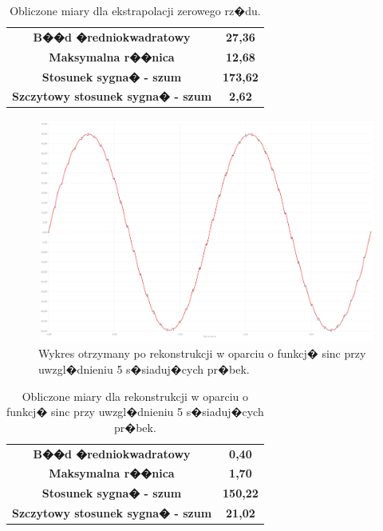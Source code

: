 \documentclass[12pt]{article}
\begin{document}
\begin{table}[h!]
\centering
\caption{Obliczone miary dla ekstrapolacji zerowego rz�du.}
\begin{tabular}{c c}
\textbf{B��d �redniokwadratowy} & \textbf{27,36} \\
\textbf{Maksymalna r��nica} & \textbf{12,68} \\
\textbf{Stosunek sygna� - szum} & \textbf{173,62} \\
\textbf{Szczytowy stosunek sygna� - szum} & \textbf{2,62} \\
\end{tabular}
\end{table}

\begin{figure}[h!]
\includegraphics[scale=0.35]{w2.png}
\caption{Wykres otrzymany po rekonstrukcji w oparciu o funkcj� sinc przy uwzgl�dnieniu 5 s�siaduj�cych pr�bek.}
\end{figure}


\begin{table}[h!]
\centering
\caption{Obliczone miary dla rekonstrukcji w oparciu o funkcj� sinc przy uwzgl�dnieniu 5 s�siaduj�cych pr�bek.}
\begin{tabular}{c c}
\textbf{B��d �redniokwadratowy} & \textbf{0,40} \\
\textbf{Maksymalna r��nica} & \textbf{1,70} \\
\textbf{Stosunek sygna� - szum} & \textbf{150,22} \\
\textbf{Szczytowy stosunek sygna� - szum} & \textbf{21,02} \\
\end{tabular}
\end{table}
\end{document}
